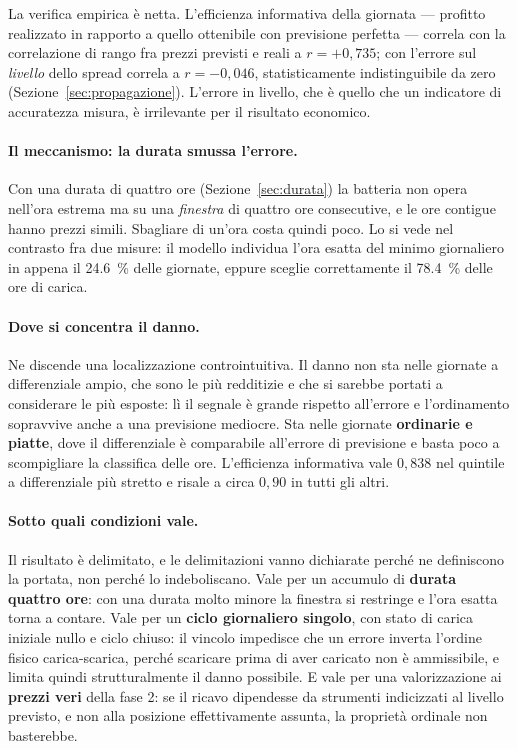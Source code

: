La verifica empirica \`e netta. L'efficienza informativa della giornata --- profitto
realizzato in rapporto a quello ottenibile con previsione perfetta --- correla con la
correlazione di rango fra prezzi previsti e reali a $r = +0{,}735$; con l'errore sul
\emph{livello} dello spread correla a $r = -0{,}046$, statisticamente indistinguibile da zero
(Sezione~\ref{sec:propagazione}). L'errore in livello, che \`e quello che un indicatore di
accuratezza misura, \`e irrilevante per il risultato economico.

\paragraph{Il meccanismo: la durata smussa l'errore.} Con una durata di quattro ore
(Sezione~\ref{sec:durata}) la batteria non opera nell'ora estrema ma su una \emph{finestra}
di quattro ore consecutive, e le ore contigue hanno prezzi simili. Sbagliare di un'ora costa
quindi poco. Lo si vede nel contrasto fra due misure: il modello individua l'ora esatta del
minimo giornaliero in appena il \SI{24,6}{\percent} delle giornate, eppure sceglie
correttamente il \SI{78,4}{\percent} delle ore di carica.

\paragraph{Dove si concentra il danno.} Ne discende una localizzazione controintuitiva. Il
danno non sta nelle giornate a differenziale ampio, che sono le pi\`u redditizie e che si
sarebbe portati a considerare le pi\`u esposte: l\`i il segnale \`e grande rispetto
all'errore e l'ordinamento sopravvive anche a una previsione mediocre. Sta nelle giornate
\textbf{ordinarie e piatte}, dove il differenziale \`e comparabile all'errore di previsione e
basta poco a scompigliare la classifica delle ore. L'efficienza informativa vale $0{,}838$
nel quintile a differenziale pi\`u stretto e risale a circa $0{,}90$ in tutti gli altri.

\paragraph{Sotto quali condizioni vale.} Il risultato \`e delimitato, e le delimitazioni
vanno dichiarate perch\'e ne definiscono la portata, non perch\'e lo indeboliscano. Vale per
un accumulo di \textbf{durata quattro ore}: con una durata molto minore la finestra si
restringe e l'ora esatta torna a contare. Vale per un \textbf{ciclo giornaliero singolo},
con stato di carica iniziale nullo e ciclo chiuso: il vincolo impedisce che un errore
inverta l'ordine fisico carica-scarica, perch\'e scaricare prima di aver caricato non \`e
ammissibile, e limita quindi strutturalmente il danno possibile. E vale per una
valorizzazione ai \textbf{prezzi veri} della fase 2: se il ricavo dipendesse da strumenti
indicizzati al livello previsto, e non alla posizione effettivamente assunta, la propriet\`a
ordinale non basterebbe.
